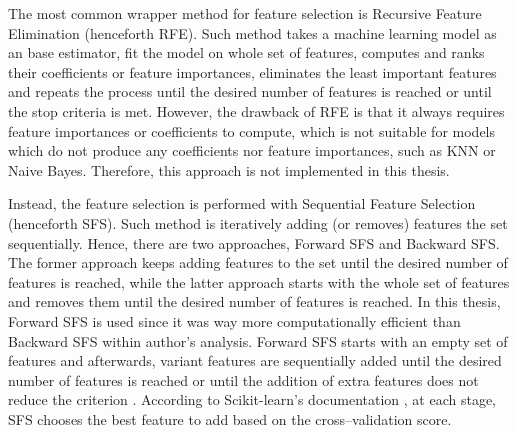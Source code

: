 The most common wrapper method for feature selection is Recursive Feature Elimination (henceforth RFE). Such method takes a machine learning model as an base estimator, fit the model on whole set of features, computes and ranks their coefficients or feature importances, eliminates the least important features and repeats the process until the desired number of features is reached \citep{Brownlee2020} or until the stop criteria is met.
However, the drawback of RFE is that it always requires feature importances or coefficients to compute, which is not suitable for models which do not produce any coefficients nor feature importances, such as KNN or Naive Bayes. Therefore, this approach is not implemented in this thesis.

Instead, the feature selection is performed with Sequential Feature Selection (henceforth SFS). Such method is iteratively adding (or removes) features the set sequentially. Hence, there are two approaches, Forward SFS and Backward SFS.
The former approach keeps adding features to the set until the desired number of features is reached, while the latter approach starts with the whole set of features and removes them until the desired number of features is reached.
In this thesis, Forward SFS is used since it was way more computationally efficient than Backward SFS within author's analysis. Forward SFS starts with an empty set of features and afterwards, variant features are sequentially added until the desired number of features is reached  or until the addition of extra features does not reduce the criterion \citep{Verma2021}. 
According to Scikit-learn's documentation \citep{sfs}, at each stage, SFS chooses the best feature to add based on the cross--validation score. 


